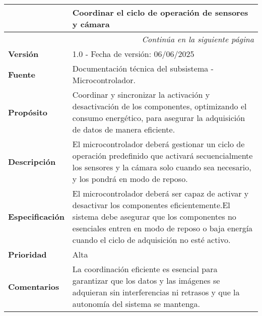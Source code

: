 \begin{longtable}{|l|p{}|}
\hline
\textbf{} & \textbf{Coordinar el ciclo de operación de sensores y cámara} \\
\hline
\endfirsthead
\multicolumn{2}{r}{\textit{Continúa en la siguiente página}} \\
\endfoot
\endlastfoot
\textbf{Versión} & 1.0 - Fecha de versión: 06/06/2025 \\ \hline
\textbf{Fuente} & Documentación técnica del subsistema - Microcontrolador.\\ \hline
\textbf{Propósito} & Coordinar y sincronizar la activación y desactivación de los componentes, optimizando el consumo energético, para asegurar la adquisición de datos de manera eficiente.\\ \hline
\textbf{Descripción} & El microcontrolador deberá gestionar un ciclo de operación predefinido que activará secuencialmente los sensores y la cámara solo cuando sea necesario, y los pondrá en modo de reposo.\\ \hline
\textbf{Especificación} &  El microcontrolador deberá ser capaz de activar y desactivar los componentes eficientemente.El sistema debe asegurar que los componentes no esenciales entren en modo de reposo o baja energía cuando el ciclo de adquisición no esté activo.\\ \hline
\textbf{Prioridad} & Alta \\ \hline
\textbf{Comentarios} & La coordinación eficiente es esencial para garantizar que los datos y las imágenes se adquieran sin interferencias ni retrasos y que la autonomía del sistema se mantenga.\\ \hline
\end{longtable}

